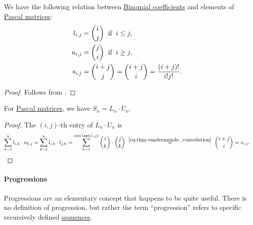 \begin{proposition}\label{thm:pascal_matrix_binomial}
  We have the following relation between \hyperref[def:binomial_coefficient]{Binomial coefficients} and elements of \hyperref[def:pascal_matrix]{Pascal matrices}:
  \begin{align*}
    l_{i,j} &= \binom i j \thickspace\T{if}\thickspace i \leq j, \\
    u_{i,j} &= \binom j i \thickspace\T{if}\thickspace i \geq j, \\
    s_{i,j} &= \binom {i + j} j = \binom {i + j} i = \frac {(i + j)!} {i! j!}. \\
  \end{align*}
\end{proposition}
\begin{proof}
  Follows from .
\end{proof}

\begin{proposition}\label{thm:pascal_matrix_product}
  For \hyperref[def:pascal_matrix]{Pascal matrices}, we have \( S_n = L_n \cdot U_n \).
\end{proposition}
\begin{proof}
  The \( (i, j) \)-th entry of \( L_n \cdot U_n \) is
  \begin{equation*}
    \sum_{k=1}^n l_{i,k} \cdot u_{k,j}
    =
    \sum_{k=1}^n l_{i,k} \cdot l_{j,k}
    =
    \sum_{k=1}^{\min\set{ i, j }} \binom i k \cdot \binom j k
    \reloset {\eqref{eq:thm:vandermonde_convolution}} =
    \binom {i + j} i
    =
    s_{i,j}.
  \end{equation*}
\end{proof}

\paragraph{Progressions}\hfill

Progressions are an elementary concept that happens to be quite useful. There is no definition of progression, but rather the term \enquote{progression} refers to specific recursively defined \hyperref[def:sequence]{sequences}.


